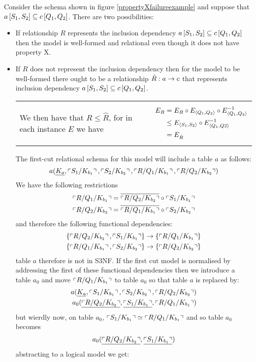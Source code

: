 Consider the schema shown in figure \ref{propertyXfailureexample} and suppose that $a\left[S_1,S_2\right]\subseteq c\left[Q_1,Q_2\right]$. 
There are two possibilities:
\begin{itemize}
\item 
If relationship $R$ represents the inclusion dependency
$a\left[S_1,S_2\right]\subseteq c\left[Q_1,Q_2\right]$ then the model is well-formed and relational even though it does not have property X.
\item
If $R$ does not represent the inclusion dependency then for the model to be well-formed there ought to be a relationship
$\hat{R}:a \rightarrow c$ that represents inclusion dependency $a\left[S_1,S_2\right]\subseteq c\left[Q_1,Q_2\right]$. \\

\begin{tabular}{ p{8.5cm}  c}
We then have that $R \leq \hat{R}$, for in each instance $E$ we have&\parbox{5cm}{ \begin{align*}
E_R&=E_R \circ E_{\langle Q_1,Q_2\rangle} \circ E^{-1}_{\langle Q_1,Q_2\rangle} \\
   & \leq E_{\langle S_1,S_2\rangle} \circ E^{-1}_{\langle Q_1,Q2\rangle} \\
	 & = E_{\hat{R}}
\end{align*}}
\end{tabular}
The first-cut relational schema for this model will include a table $a$ as follows:
\begin{equation}
a(\underline{K_a},\left\ulcorner S_1/K_{b_1}\right\urcorner,\left\ulcorner S_2/K_{b_2}\right\urcorner, \left\ulcorner R/Q_1/K_{b_1}\right\urcorner, \left\ulcorner R/Q_2/K_{b_2}\right\urcorner)
\end{equation}
We have the following restrictions
\begin{align}
\left\ulcorner R/Q_1/K_{b_1}\right\urcorner = \overline{\left\ulcorner R/Q_2/K_{b_2}\right\urcorner} \circ \left\ulcorner S_1/K_{b_1}\right\urcorner \\
\left\ulcorner R/Q_2/K_{b_2}\right\urcorner = \overline{\left\ulcorner R/Q_1/K_{b_1}\right\urcorner} \circ \left\ulcorner S_2/K_{b_2}\right\urcorner
\end{align}
and therefore the following functional dependencies:
\begin{align}
\left\{\left\ulcorner R/Q_2/K_{b_2}\right\urcorner,\left\ulcorner S_1/K_{b_1}\right\urcorner\right\} \rightarrow \left\{\left\ulcorner R/Q_1/K_{b_1}\right\urcorner\right\} \\
\left\{\left\ulcorner R/Q_1/K_{b_1}\right\urcorner,\left\ulcorner S_2/K_{b_2}\right\urcorner\right\} \rightarrow \left\{\left\ulcorner R/Q_2/K_{b_2}\right\urcorner\right\} 
\end{align}
table $a$ therefore is not in S3NF.
If the first cut model is normalised by addressing the first of these functional dependencies then we 
introduce a table $a_0$ and move $\left\ulcorner R/Q_1/K_{b_1}\right\urcorner$ to table $a_0$ so that table $a$ is replaced by:
\begin{align}
a(\underline{K_a},\left\ulcorner S_1/K_{b_1}\right\urcorner,\left\ulcorner S_2/K_{b_2}\right\urcorner, \left\ulcorner R/Q_2/K_{b_2}\right\urcorner) \\
a_0(\underline{\left\ulcorner R/Q_2/K_{b_2}\right\urcorner},\underline{\left\ulcorner S_1/K_{b_1}\right\urcorner}, \left\ulcorner R/Q_1/K_{b_1}\right\urcorner )
\end{align}
but wierdly now, on table $a_0$,  $\left\ulcorner S_1/K_{b_1}\right\urcorner \simeq \left\ulcorner R/Q_1/K_{b_1}\right\urcorner$ and so table $a_0$ becomes
\begin{align}
a_0(\underline{\left\ulcorner R/Q_2/K_{b_2}\right\urcorner},\underline{\left\ulcorner S_1/K_{b_1}\right\urcorner} )
\end{align}
abstracting to a logical model we get:


\end{itemize}
